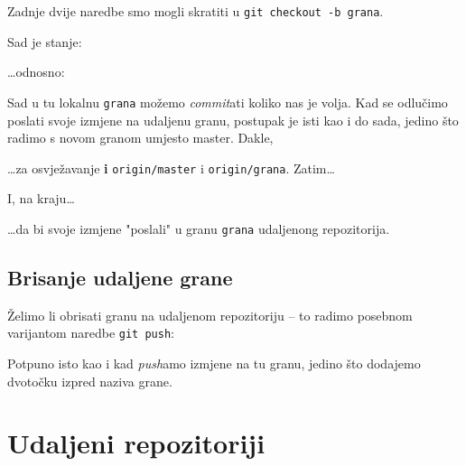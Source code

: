 
Zadnje dvije naredbe smo mogli skratiti u \verb+git checkout -b grana+.

Sad je stanje:



\dots{}odnosno:



Sad u tu lokalnu \verb+grana+ možemo \emph{commit}ati koliko nas je volja.
Kad se odlučimo poslati svoje izmjene na udaljenu granu, postupak je isti kao i do sada, jedino što radimo s novom granom umjesto master.
Dakle,


\dots{}za osvježavanje \textbf{i} \verb+origin/master+ i \verb+origin/grana+.
Zatim\dots


I, na kraju\dots


\dots{}da bi svoje izmjene "poslali" u granu \verb+grana+ udaljenong repozitorija.

\subsection*{Brisanje udaljene grane}

Želimo li obrisati granu na udaljenom repozitoriju -- to radimo posebnom varijantom naredbe \verb+git push+:


Potpuno isto kao i kad \emph{push}amo izmjene na tu granu, jedino što dodajemo dvotočku izpred naziva grane.

%

\section*{Udaljeni repozitoriji}

